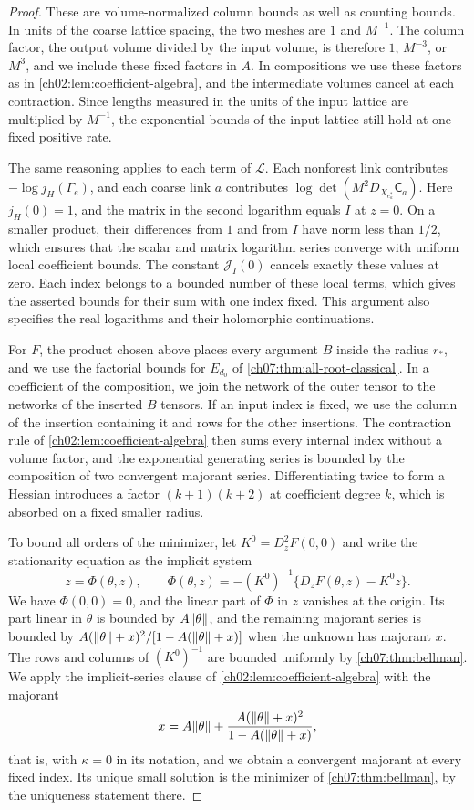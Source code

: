 \begin{proof}
These are volume-normalized column bounds as well as counting bounds. In units of the coarse lattice spacing, the two meshes are $1$ and $M^{-1}$. The column factor, the output volume divided by the input volume, is therefore $1$, $M^{-3}$, or $M^3$, and we include these fixed factors in $A$. In compositions we use these factors as in \cref{ch02:lem:coefficient-algebra}, and the intermediate volumes cancel at each contraction. Since lengths measured in the units of the input lattice are multiplied by $M^{-1}$, the exponential bounds of the input lattice still hold at one fixed positive rate.

The same reasoning applies to each term of $\mathcal L$. Each nonforest link contributes $-\log j_H(\Gamma_e)$, and each coarse link $a$ contributes $\log\det(M^2D_{X_{e^*_a}}\mathsf C_a)$. Here $j_H(0)=1$, and the matrix in the second logarithm equals $I$ at $z=0$. On a smaller product, their differences from $1$ and from $I$ have norm less than $1/2$, which ensures that the scalar and matrix logarithm series converge with uniform local coefficient bounds. The constant $\mathcal J_I(0)$ cancels exactly these values at zero. Each index belongs to a bounded number of these local terms, which gives the asserted bounds for their sum with one index fixed. This argument also specifies the real logarithms and their holomorphic continuations.

For $F$, the product chosen above places every argument $B$ inside the radius $r_*$, and we use the factorial bounds for $E_{d_0}$ of \cref{ch07:thm:all-root-classical}. In a coefficient of the composition, we join the network of the outer tensor to the networks of the inserted $B$ tensors. If an input index is fixed, we use the column of the insertion containing it and rows for the other insertions. The contraction rule of \cref{ch02:lem:coefficient-algebra} then sums every internal index without a volume factor, and the exponential generating series is bounded by the composition of two convergent majorant series. Differentiating twice to form a Hessian introduces a factor $(k+1)(k+2)$ at coefficient degree $k$, which is absorbed on a fixed smaller radius.

To bound all orders of the minimizer, let $K^0=D_z^2F(0,0)$ and write the stationarity equation as the implicit system
\begin{equation}\label{ch09:eq:center-equation}
 z=\Phi(\theta,z),\qquad \Phi(\theta,z)=-(K^0)^{-1}\{D_zF(\theta,z)-K^0z\}.
\end{equation}
We have $\Phi(0,0)=0$, and the linear part of $\Phi$ in $z$ vanishes at the origin. Its part linear in $\theta$ is bounded by $A\lVert \theta\rVert$, and the remaining majorant series is bounded by $A(\lVert \theta\rVert+x)^2/[1-A(\lVert \theta\rVert+x)]$ when the unknown has majorant $x$. The rows and columns of $(K^0)^{-1}$ are bounded uniformly by \cref{ch07:thm:bellman}. We apply the implicit-series clause of \cref{ch02:lem:coefficient-algebra} with the majorant
\[
 x=A\lVert \theta\rVert+\frac{A(\lVert \theta\rVert+x)^2}{1-A(\lVert \theta\rVert+x)},
\]
that is, with $\kappa=0$ in its notation, and we obtain a convergent majorant at every fixed index. Its unique small solution is the minimizer of \cref{ch07:thm:bellman}, by the uniqueness statement there.


\end{proof}
